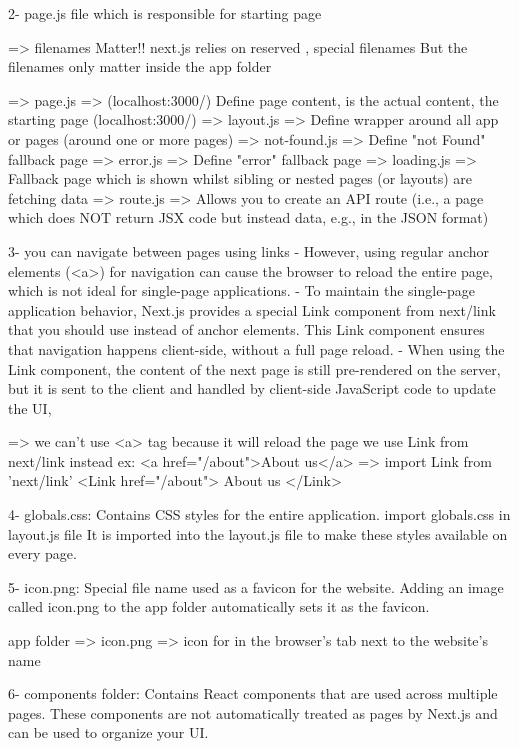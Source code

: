 2- page.js file which is responsible for starting page

    => filenames Matter!!
            next.js relies on reserved , special filenames
            But the filenames only matter inside the app folder

        => page.js => (localhost:3000/) Define page content, is the actual content, the starting page (localhost:3000/)
        => layout.js => Define wrapper around all app or  pages (around one or more pages)
        => not-found.js => Define "not Found" fallback page
        => error.js => Define "error" fallback page
        => loading.js => Fallback page which is shown whilst sibling or nested pages (or layouts) are fetching data
        => route.js => Allows you to create an API route (i.e., a page which does NOT return JSX code but instead data, e.g., in the JSON format)


3- you can navigate between pages using links
        - However, using regular anchor elements (<a>) for navigation can cause the browser to reload the entire page,
          which is not ideal for single-page applications.
        - To maintain the single-page application behavior, Next.js provides a special Link component from next/link that you should use instead of anchor elements. 
            This Link component ensures that navigation happens client-side, without a full page reload.
        - When using the Link component, the content of the next page is still pre-rendered on the server,
          but it is sent to the client and handled by client-side JavaScript code to update the UI, 

    => we can't use <a> tag because it will reload the page 
       we use Link from next/link instead
        ex:
            <a href="/about">About us</a>
            => import Link from 'next/link'
            <Link href="/about"> About us </Link>
         

4- globals.css: Contains CSS styles for the entire application.
    import globals.css in layout.js file
     It is imported into the layout.js file to make these styles available on every page.

5- icon.png: Special file name used as a favicon for the website.
    Adding an image called icon.png to the app folder automatically sets it as the favicon.

    app folder => icon.png => icon for in the browser's tab next to the website's name

6- components folder: Contains React components that are used across multiple pages.
    These components are not automatically treated as pages by Next.js and can be used to organize your UI.

